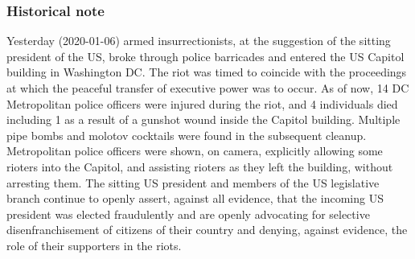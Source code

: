 \begin{frame}[t]
  \frametitle{Historical note}
    Yesterday (2020-01-06) armed insurrectionists, at the suggestion of the sitting president of the US, broke through police barricades and entered the US Capitol building in Washington DC. 
    The riot was timed to coincide with the proceedings at which the peaceful transfer of executive power was to occur.  
    As of now, 14 DC Metropolitan police officers were injured during the riot, and 4 individuals died including 1 as a result of a gunshot wound inside the Capitol building. 
    Multiple pipe bombs and molotov cocktails were found in the subsequent cleanup.
    Metropolitan police officers were shown, on camera, explicitly allowing some rioters into the Capitol, and assisting rioters as they left the building, without arresting them.
    The sitting US president and members of the US legislative branch continue to openly assert, against all evidence, that the incoming US president was elected fraudulently and are openly advocating for selective disenfranchisement of citizens of their country and denying, against evidence, the role of their supporters in the riots.
    
\end{frame}
